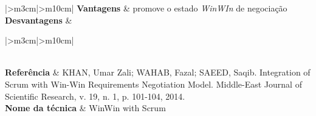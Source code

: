 \begin{longtable}{{|>{\centering\arraybackslash}m{3cm}|>{\centering\arraybackslash}m{10cm}|}}
\textbf{Vantagens}                                          & promove o estado \textit{WinWIn} de negociação                                                                                                                                                                                                       \\ \hline
\textbf{Desvantagens}                                       &                                                                                                                                                                                                                                             \\ \hline

\end{longtable}


\begin{longtable}{{|>{\centering\arraybackslash}m{3cm}|>{\centering\arraybackslash}m{10cm}|}}
\caption{\label{fig:t16}Integration of Scrum with Win-Win Requirements
Negotiation Model}\\
\hline
\textbf{Referência}                                         & KHAN, Umar Zali;
WAHAB, Fazal; SAEED, Saqib. Integration of Scrum with Win-Win Requirements
Negotiation Model. Middle-East Journal of Scientific Research, v. 19, n. 1, p.
101-104, 2014. \cite{khan2014integration}                                                             
\\ \hline \textbf{Nome da técnica}                                    & WinWin
with Scrum                                                                       

\end{longtable}
